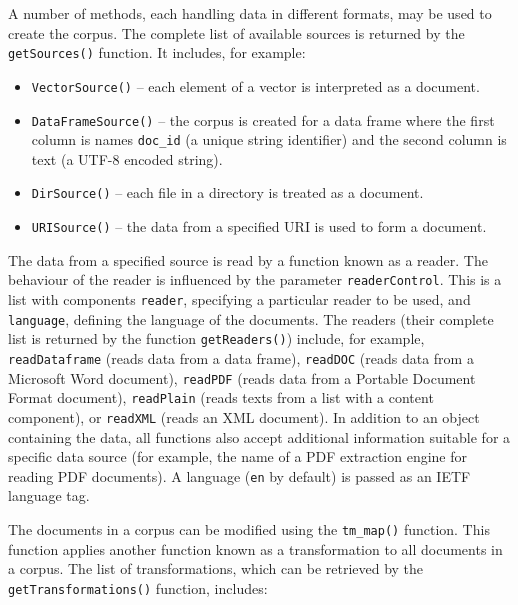 A number of methods, each handling data in different formats, may be used
to create the corpus. The complete list of available sources is returned by the
\texttt{getSources()} function. It includes, for example:

\begin{itemize}
    \item \texttt{VectorSource()} – each element of a vector is interpreted as a document.

    \item \texttt{DataFrameSource()} – the corpus is created for a data frame where the
first column is names \texttt{doc\_id} (a unique string identifier) and the second
column is text (a UTF-8 encoded string).

    \item \texttt{DirSource()} – each file in a directory is treated as a document.

    \item \texttt{URISource()} – the data from a specified URI is used to form a document.
\end{itemize}

The data from a specified source is read by a function known as a reader.
The behaviour of the reader is influenced by the parameter \texttt{readerControl}.
This is a list with components \texttt{reader}, specifying a particular reader to be
used, and \texttt{language}, defining the language of the documents. The readers (their
complete list is returned by the function \texttt{getReaders()}) include, for example,
\texttt{readDataframe} (reads data from a data frame), \texttt{readDOC} (reads data from a Microsoft Word document), \texttt{readPDF} (reads data from a Portable Document Format
document), \texttt{readPlain} (reads texts from a list with a content component), or
\texttt{readXML} (reads an XML document). In addition to an object containing the data,
all functions also accept additional information suitable for a specific data source
(for example, the name of a PDF extraction engine for reading PDF documents).
A language (\texttt{en} by default) is passed as an IETF language tag.

The documents in a corpus can be modified using the \texttt{tm\_map()} function.
This function applies another function known as a transformation to all documents in a corpus. The list of transformations, which can be retrieved by the
\texttt{getTransformations()} function, includes:

